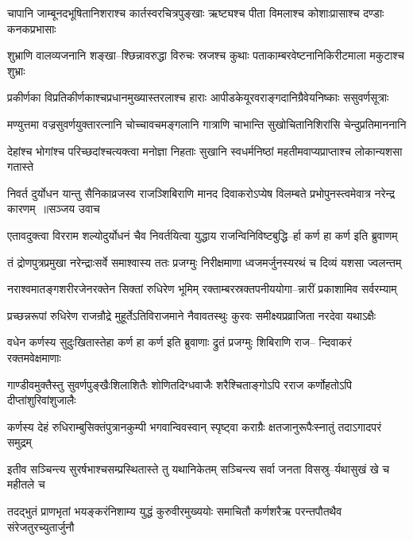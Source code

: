 \twolineshloka
{चापानि जाम्बूनदभूषितानिशराश्च कार्तस्वरचित्रपुङ्खाः}
{ऋष्ट्यश्च पीता विमलाश्च कोशाःप्रासाश्च दण्डाः कनकप्रभासाः}


\twolineshloka
{शुभ्राणि वालव्यजनानि शङ्खा--श्छिन्नावरुद्धा विरुचः स्रजश्च}
{कुथाः पताकाम्बरवेष्टनानिकिरीटमाला मकुटाश्च शुभ्राः}


\twolineshloka
{प्रकीर्णका विप्रतिकीर्णकाश्चप्रधानमुख्यास्तरलाश्च हाराः}
{आपीडकेयूरवराङ्गदानिग्रैवेयनिष्काः ससुवर्णसूत्राः}


\twolineshloka
{मण्युत्तमा वज्रसुवर्णयुक्तारत्नानि चोच्चावचमङ्गलानि}
{गात्राणि चाभान्ति सुखोचितानिशिरांसि चेन्दुप्रतिमाननानि}


\twolineshloka
{देहांश्च भोगांश्च परिच्छदांश्चत्यक्त्वा मनोज्ञा निहताः सुखानि}
{स्वधर्मनिष्ठां महतीमवाप्यप्राप्ताश्च लोकान्यशसा गतास्ते}


\threelineshloka
{निवर्त दुर्योधन यान्तु सैनिकाव्रजस्व राजञ्शिबिराणि मानद}
{दिवाकरोऽप्येष विलम्बते प्रभोपुनस्त्वमेवात्र नरेन्द्र कारणम् ॥सञ्जय उवाच}
{}


\twolineshloka
{एतावदुक्त्वा विरराम शल्योदुर्योधनं चैव निवर्तयित्वा}
{युद्धाय राजन्विनिविष्टबुद्धि--र्हा कर्ण हा कर्ण इति ब्रुवाणम्}


\twolineshloka
{तं द्रोणपुत्रप्रमुखा नरेन्द्राःसर्वे समाश्वास्य ततः प्रजग्मुः}
{निरीक्षमाणा ध्वजमर्जुनस्यरथं च दिव्यं यशसा ज्वलन्तम्}


\twolineshloka
{नराश्वमातङ्गशरीरजेनरक्तेन सिक्तां रुधिरेण भूमिम्}
{रक्ताम्बरस्रक्तपनीययोगा--न्नारीं प्रकाशामिव सर्वरम्याम्}


\twolineshloka
{प्रच्छन्नरूपां रुधिरेण राजन्रौद्रे मुहूर्तेऽतिविराजमाने}
{नैवावतस्थुः कुरवः समीक्ष्यप्रव्राजिता नरदेवा यथाऽक्षैः}


\twolineshloka
{वधेन कर्णस्य सुदुःखितास्तेहा कर्ण हा कर्ण इति ब्रुवाणाः}
{द्रुतं प्रजग्मुः शिबिराणि राज-- न्दिवाकरं रक्तमवेक्षमाणाः}


\twolineshloka
{गाण्डीवमुक्तैस्तु सुवर्णपुङ्खैःशिलाशितैः शोणितदिग्धवाजैः}
{शरैश्चिताङ्गोऽपि रराज कर्णोहतोऽपि दीप्तांशुरिवांशुजालैः}


\twolineshloka
{कर्णस्य देहं रुधिराम्बुसिक्तंपुत्रानकुम्पी भगवान्विवस्वान्}
{स्पृष्ट्वा कराग्रैः क्षतजानुरूपैःस्नातुं तदाऽगादपरं समुद्रम्}


\twolineshloka
{इतीव सञ्चिन्त्य सुरर्षभाश्चसम्प्रस्थितास्ते तु यथानिकेतम्}
{सञ्चिन्त्य सर्वा जनता विसस्रु--र्यथासुखं खे च महीतले च}


\twolineshloka
{तदद्भुतं प्राणभृतां भयङ्करंनिशाम्य युद्धं कुरुवीरमुख्ययोः}
{समाचितौ कर्णशरैऋ परन्तपौतथैव संरेजतुरच्युतार्जुनौ}


